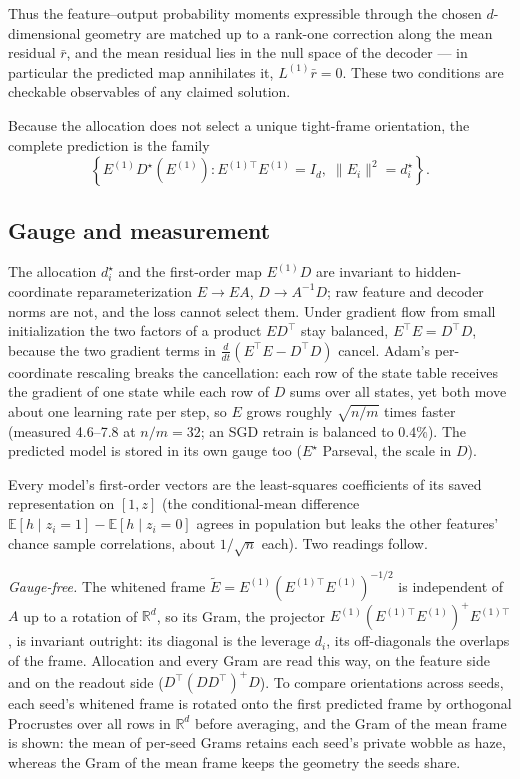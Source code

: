 Thus the feature--output probability moments expressible through the chosen
\(d\)-dimensional geometry are matched up to a rank-one correction along the mean
residual \(\bar r\), and the mean residual lies in the null space of the decoder —
in particular the predicted map annihilates it, \(L^{(1)}\bar r=0\). These two
conditions are checkable observables of any claimed solution.

Because the allocation does not select a unique tight-frame orientation, the complete
prediction is the family
\[
\left\{
E^{(1)}D^\star(E^{(1)})
:
E^{(1)\top}E^{(1)}=I_d,\;
\|E_i\|^2=d_i^\star
\right\}.
\]

\subsection{Gauge and measurement}
\label{app:balanced}

The allocation \(d_i^\star\) and the first-order map \(E^{(1)}D\) are invariant to
hidden-coordinate reparameterization \(E\to EA\), \(D\to A^{-1}D\); raw feature and
decoder norms are not, and the loss cannot select them. Under gradient flow from small
initialization the two factors of a product \(ED^\top\) stay balanced,
\(E^\top E=D^\top D\), because the two gradient terms in \(\tfrac{d}{dt}(E^\top E-D^\top D)\)
cancel. Adam's per-coordinate rescaling breaks the cancellation: each row of the state
table receives the gradient of one state while each row of \(D\) sums over all states,
yet both move about one learning rate per step, so \(E\) grows roughly
\(\sqrt{n/m}\) times faster (measured 4.6--7.8 at \(n/m=32\); an SGD retrain is balanced to
\(0.4\%\)). The predicted model is stored in its own gauge too (\(E^\star\) Parseval, the
scale in \(D\)).

Every model's first-order vectors are the least-squares coefficients of its saved
representation on \([1,z]\) (the conditional-mean difference
\(\mathbb E[h\mid z_i=1]-\mathbb E[h\mid z_i=0]\) agrees in population but leaks the other
features' chance sample correlations, about \(1/\sqrt n\) each). Two readings follow.

\emph{Gauge-free.} The whitened frame \(\tilde E=E^{(1)}(E^{(1)\top}E^{(1)})^{-1/2}\) is
independent of \(A\) up to a rotation of \(\mathbb R^d\), so its Gram, the projector
\(E^{(1)}(E^{(1)\top}E^{(1)})^{+}E^{(1)\top}\), is invariant outright: its diagonal is
the leverage \(d_i\), its off-diagonals the overlaps of the frame. Allocation and every
Gram are read this way, on the feature side and on the readout side
(\(D^\top(DD^\top)^{+}D\)). To compare orientations across seeds, each seed's whitened
frame is rotated onto the first predicted frame by orthogonal Procrustes over all rows
in \(\mathbb R^d\) before averaging, and the Gram of the mean frame is shown: the mean of
per-seed Grams retains each seed's private wobble as haze, whereas the Gram of the mean
frame keeps the geometry the seeds share.

